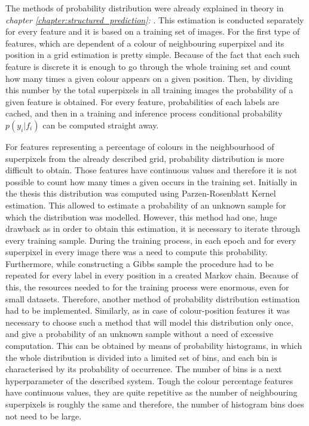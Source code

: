 The methods of probability distribution were already explained in theory in \textit{chapter \ref{chapter:structured_prediction}: }. This estimation is conducted separately for every feature and it is based on a training set of images. For the first type of features, which are dependent of a colour of neighbouring superpixel and its position in a grid estimation is pretty simple. Because of the fact that each such feature is discrete it is enough to go through the whole training set and count how many times a given colour appears on a given position. Then, by dividing this number by the total superpixels in all training images the probability of a given feature is obtained. For every feature, probabilities of each labels are cached, and then in a training and inference process conditional probability $p(y_i|f_i)$ can be computed straight away.

For features representing a percentage of colours in the neighbourhood of superpixels from the already described grid, probability distribution is more difficult to obtain. Those features have continuous values and therefore it is not possible to count how many times a given occurs in the training set. Initially in the thesis this distribution was computed using Parzen-Rosenblatt Kernel estimation. This allowed to estimate a probability of an unknown sample for which the distribution was modelled. However, this method had one, huge drawback as in order to obtain this estimation, it is necessary to iterate through every training sample. During the training process, in each epoch and for every superpixel in every image there was a need to compute this probability. Furthermore, while constructing a Gibbs sample the procedure had to be repeated for every label in every position in a created Markov chain. Because of this, the resources needed to for the training process were enormous, even for small datasets. Therefore, another method of probability distribution estimation had to be implemented. Similarly, as in case of colour-position features it was necessary to choose such a method that will model this distribution only once, and give a probability of an unknown sample without a need of excessive computation. This can be obtained by means of probability histograms, in which the whole distribution is divided into a limited set of bins, and each bin is characterised by its probability of occurrence. The number of bins is a next hyperparameter of the described system. Tough the colour percentage features have continuous values, they are quite repetitive as the number of neighbouring superpixels is roughly the same and therefore, the number of histogram bins does not need to be large. 


